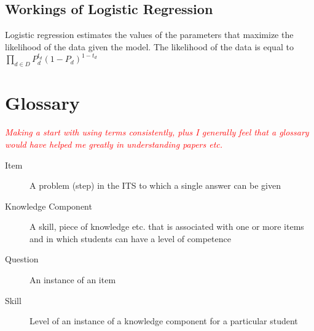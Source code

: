 \documentclass{scrartcl}
\newcommand\todo[1]{\textit{\textcolor{red}{#1}}}
\begin{document}
\subsection{Workings of Logistic Regression}
Logistic regression estimates the values of the parameters that maximize the likelihood of the data given the model. The likelihood of the data is equal to $\prod_{d \in D} P_{d}^{t_d}  (1- P_{d})^{1-t_d} $

\pagebreak 
\section{Glossary}
\todo{
Making a start with using terms consistently, plus I generally feel that a glossary would have helped me greatly in understanding papers etc.}
\begin{description}
  \item[Item] A problem (step) in the ITS to which a single answer can be given
  \item[Knowledge Component] A skill, piece of knowledge etc. that is associated with one or more items and in which students can have a level of competence
  \item[Question] An instance of an item
  \item[Skill] Level of an instance of a knowledge component for a particular student
\end{description}
\end{document}
